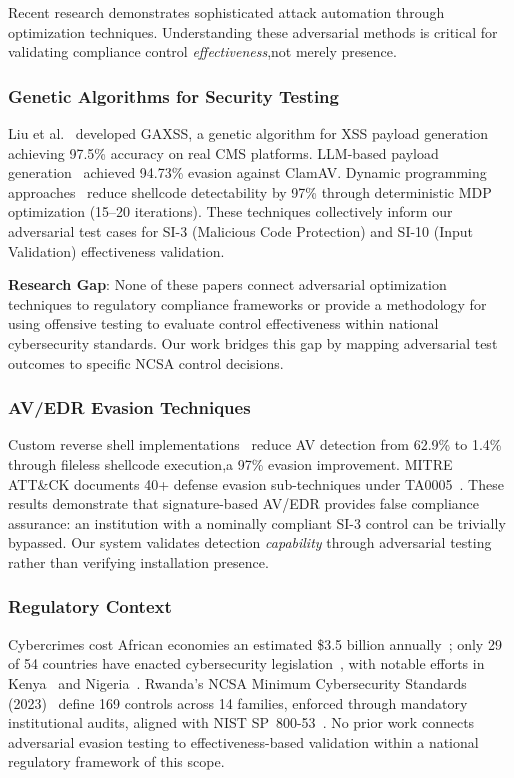 \documentclass[futureinternet,article,submit,pdftex,moreauthors]{Definitions/mdpi}
\begin{document}
Recent research demonstrates sophisticated attack automation through optimization techniques.
Understanding these adversarial methods is critical for validating compliance control
\textit{effectiveness},not merely presence.

\subsubsection{Genetic Algorithms for Security Testing}

Liu et al.~\cite{ga_xss_paper} developed GAXSS, a genetic algorithm for XSS payload
generation achieving 97.5\% accuracy on real CMS platforms. LLM-based payload
generation~\cite{llm_payload_paper} achieved 94.73\% evasion against ClamAV. Dynamic
programming approaches~\cite{dp_payload_paper} reduce shellcode detectability by 97\%
through deterministic MDP optimization (15--20 iterations). These techniques collectively
inform our adversarial test cases for SI-3 (Malicious Code Protection) and SI-10
(Input Validation) effectiveness validation.

\textbf{Research Gap}: None of these papers connect adversarial optimization techniques to
regulatory compliance frameworks or provide a methodology for using offensive testing to
evaluate control effectiveness within national cybersecurity standards. Our work bridges this
gap by mapping adversarial test outcomes to specific NCSA control decisions.

\subsubsection{AV/EDR Evasion Techniques}

Custom reverse shell implementations~\cite{reverse_shell_paper} reduce AV detection from
62.9\% to 1.4\% through fileless shellcode execution,a 97\% evasion improvement. MITRE
ATT\&CK documents 40+ defense evasion sub-techniques under TA0005~\cite{mitre_attack_sok}.
These results demonstrate that signature-based AV/EDR provides false compliance assurance:
an institution with a nominally compliant SI-3 control can be trivially bypassed. Our system
validates detection \textit{capability} through adversarial testing rather than verifying
installation presence.

\subsubsection{Regulatory Context}

Cybercrimes cost African economies an estimated \$3.5 billion annually~\cite{serianu_africa};
only 29 of 54 countries have enacted cybersecurity legislation~\cite{itu_africa_cyber}, with notable efforts in Kenya~\cite{kenya_cyber_law} and Nigeria~\cite{nigeria_cyber}.
Rwanda's NCSA Minimum Cybersecurity Standards (2023)~\cite{ncsa2023} define 169 controls
across 14 families, enforced through mandatory institutional audits, aligned with NIST
SP~800-53~\cite{nist2020}.
No prior work connects adversarial evasion testing to effectiveness-based validation within
a national regulatory framework of this scope.
\end{document}
